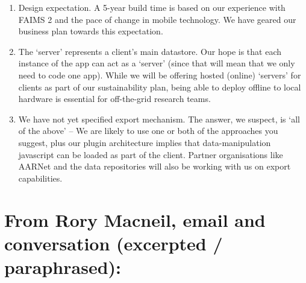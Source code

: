 \documentclass[a4paper,headings=small fontsize=10pt]{scrreprt}
\begin{document}
 \begin{enumerate}
  \def\labelenumii{\alph{enumii}.}
  
\item Design expectation. A 5-year build time is based on our experience with FAIMS 2 and the 
   pace of change in mobile technology. We have geared our business plan towards this expectation.

\item The `server' represents a client's main datastore. Our hope is that each 
   instance of the app can act as a `server' (since that will mean that we only 
   need to code one app). While we will be offering hosted (online) `servers' for clients as part of our sustainability plan, 
   being able to deploy offline to local hardware is essential for off-the-grid research teams.

\item We have not yet specified export mechanism. The answer, we suspect, is `all of the above' -- 
   We are likely to use one or both of the approaches you suggest, plus our plugin architecture implies 
   that data-manipulation javascript can be loaded as part of the client. Partner organisations like AARNet
   and the data repositories will also be working with us on export capabilities. 

\end{enumerate}

\section{From Rory Macneil, email and conversation (excerpted / paraphrased):}
\end{document}
